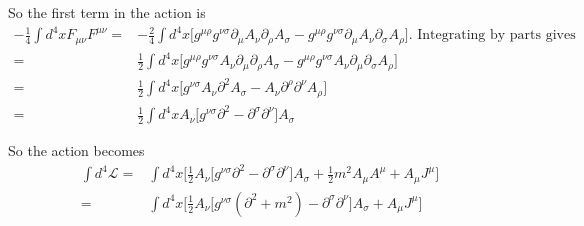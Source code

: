 \documentclass[]{article}
\newcommand{\Lagr}{\mathcal{L}}
\begin{document}
So the first term in the action is
\begin{align*}
	 -\frac{1}{4} \int d^4x F_{\mu\nu}F^{\mu\nu} =&  -\frac{2}{4} \int d^4x \big[g^{\mu\rho} g^{\nu\sigma} \partial_{\mu} A_{\nu}\partial_{\rho} A_{\sigma} -g^{\mu\rho} g^{\nu\sigma} \partial_{\mu} A_{\nu}\partial_{\sigma} A_{\rho}\big] \text{. Integrating by parts gives}\\
	 =& \frac{1}{2} \int d^4x \big[g^{\mu\rho} g^{\nu\sigma}  A_{\nu}\partial_{\mu}\partial_{\rho} A_{\sigma} -g^{\mu\rho} g^{\nu\sigma}  A_{\nu}\partial_{\mu} \partial_{\sigma} A_{\rho}\big]\\
	 =& \frac{1}{2} \int d^4x \big[ g^{\nu\sigma}  A_{\nu}\partial^2 A_{\sigma} -  A_{\nu}\partial^{\rho} \partial^{\nu} A_{\rho}\big]\\
	 =& \frac{1}{2} \int d^4x A_{\nu} \big[ g^{\nu\sigma}  \partial^2  -  \partial^{\sigma} \partial^{\nu} \big] A_{\sigma}
\end{align*}

So the action becomes
\begin{align*}
	\int d^4 \Lagr=&  \int d^4x \bigg[\frac{1}{2} A_{\nu} \big[ g^{\nu\sigma}  \partial^2  -  \partial^{\sigma} \partial^{\nu} \big] A_{\sigma} + \frac{1}{2}m^2 A_{\mu}A^{\mu} + A_{\mu}J^{\mu} \bigg]\\
	=&\int d^4x \bigg[\frac{1}{2} A_{\nu} \big[ g^{\nu\sigma}  (\partial^2 +m^2)  -  \partial^{\sigma} \partial^{\nu} \big] A_{\sigma} +  A_{\mu}J^{\mu} \bigg]
\end{align*}
\end{document}
